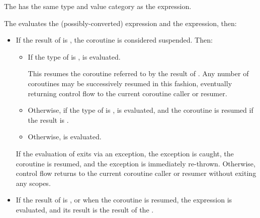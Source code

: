 \pnum
The  has the same type and value category
as the  expression.

\pnum
The  evaluates
the (possibly-converted)  expression and
the  expression, then:
\begin{itemize}
\item
If the result of  is ,
the coroutine is considered suspended.
Then:
\begin{itemize}
\item
If the type of 
is ,
 is evaluated.
\begin{note}
This resumes the coroutine referred to
by the result of .
Any number of coroutines may be successively resumed in this fashion,
eventually returning control flow to the current coroutine caller or
resumer.
\end{note}

\item
Otherwise, if the type of 
is ,
 is evaluated,
and the coroutine is resumed if the result is .

\item
Otherwise,  is evaluated.
\end{itemize}
If the evaluation of 
exits via an exception, the exception is caught,
the coroutine is resumed, and the exception is immediately
re-thrown. Otherwise, control flow returns
to the current coroutine caller or resumer
without exiting any scopes.

\item
If the result of  is ,
or when the coroutine is resumed,
the  expression is evaluated, and
its result is the result of the .
\end{itemize}

